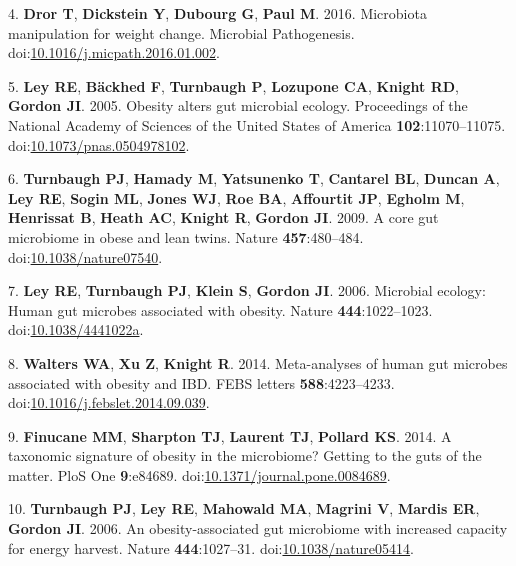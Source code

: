 \documentclass[12pt,]{article}
\begin{document}
\hypertarget{ref-drorux5fmicrobiotaux5f2016}{}
4. \textbf{Dror T}, \textbf{Dickstein Y}, \textbf{Dubourg G},
\textbf{Paul M}. 2016. Microbiota manipulation for weight change.
Microbial Pathogenesis.
doi:\href{https://doi.org/10.1016/j.micpath.2016.01.002}{10.1016/j.micpath.2016.01.002}.

\hypertarget{ref-leyux5fobesityux5f2005}{}
5. \textbf{Ley RE}, \textbf{Bäckhed F}, \textbf{Turnbaugh P},
\textbf{Lozupone CA}, \textbf{Knight RD}, \textbf{Gordon JI}. 2005.
Obesity alters gut microbial ecology. Proceedings of the National
Academy of Sciences of the United States of America
\textbf{102}:11070--11075.
doi:\href{https://doi.org/10.1073/pnas.0504978102}{10.1073/pnas.0504978102}.

\hypertarget{ref-turnbaughux5fcoreux5f2009}{}
6. \textbf{Turnbaugh PJ}, \textbf{Hamady M}, \textbf{Yatsunenko T},
\textbf{Cantarel BL}, \textbf{Duncan A}, \textbf{Ley RE}, \textbf{Sogin
ML}, \textbf{Jones WJ}, \textbf{Roe BA}, \textbf{Affourtit JP},
\textbf{Egholm M}, \textbf{Henrissat B}, \textbf{Heath AC},
\textbf{Knight R}, \textbf{Gordon JI}. 2009. A core gut microbiome in
obese and lean twins. Nature \textbf{457}:480--484.
doi:\href{https://doi.org/10.1038/nature07540}{10.1038/nature07540}.

\hypertarget{ref-leyux5fmicrobialux5f2006}{}
7. \textbf{Ley RE}, \textbf{Turnbaugh PJ}, \textbf{Klein S},
\textbf{Gordon JI}. 2006. Microbial ecology: Human gut microbes
associated with obesity. Nature \textbf{444}:1022--1023.
doi:\href{https://doi.org/10.1038/4441022a}{10.1038/4441022a}.

\hypertarget{ref-waltersux5fmeta-analysesux5f2014}{}
8. \textbf{Walters WA}, \textbf{Xu Z}, \textbf{Knight R}. 2014.
Meta-analyses of human gut microbes associated with obesity and IBD.
FEBS letters \textbf{588}:4223--4233.
doi:\href{https://doi.org/10.1016/j.febslet.2014.09.039}{10.1016/j.febslet.2014.09.039}.

\hypertarget{ref-finucaneux5ftaxonomicux5f2014}{}
9. \textbf{Finucane MM}, \textbf{Sharpton TJ}, \textbf{Laurent TJ},
\textbf{Pollard KS}. 2014. A taxonomic signature of obesity in the
microbiome? Getting to the guts of the matter. PloS One
\textbf{9}:e84689.
doi:\href{https://doi.org/10.1371/journal.pone.0084689}{10.1371/journal.pone.0084689}.

\hypertarget{ref-turnbaughux5fobesity-associatedux5f2006}{}
10. \textbf{Turnbaugh PJ}, \textbf{Ley RE}, \textbf{Mahowald MA},
\textbf{Magrini V}, \textbf{Mardis ER}, \textbf{Gordon JI}. 2006. An
obesity-associated gut microbiome with increased capacity for energy
harvest. Nature \textbf{444}:1027--31.
doi:\href{https://doi.org/10.1038/nature05414}{10.1038/nature05414}.
\end{document}
